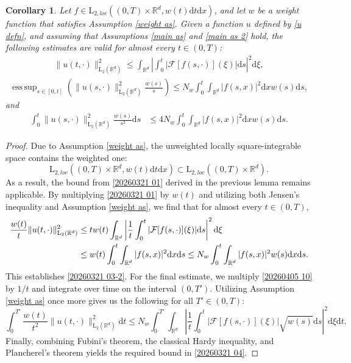 \documentclass[11pt,reqno]{amsart}
\newtheorem{corollary}[thm]{Corollary}
\theoremstyle{definition}
\theoremstyle{remark}
\newcommand\bR{\mathbb{R}}
\DeclareMathOperator*{\esssup}{ess\,sup}
\numberwithin{equation}{section}
\begin{document}
\begin{corollary}
							\label{l2 bounded corollary 1}
Let $f \in \mathrm{L}_{2,loc}\left( (0,T) \times \mathbb{R}^d, w(t)\mathrm{d}t\mathrm{d}x \right)$, and let $w$ be a weight function that satisfies Assumption \ref{weight as}. 
Given a function $u$ defined by \eqref{u defn}, and assuming that Assumptions \ref{main as} and \ref{main as 2} hold, the following estimates are valid for almost every $t \in (0,T)$:
\begin{align*}
\|u(t,\cdot)\|^2_{\mathrm{L}_2(\mathbb{R}^d)}  
\leq \int_{\mathbb{R}^d} \left|\int_0^t |\mathcal{F}[f(s,\cdot)](\xi)| \mathrm{d}s \right|^2 \mathrm{d}\xi,
\end{align*}
\begin{align}
										\label{20260321 03-2}
\esssup_{s \in [0,t]} \left( \|u(s,\cdot)\|^2_{\mathrm{L}_2(\bR^d)} \frac{w(s)}{s} \right)
\leq  N_w\int_0^{t} \int_{\bR^d} |f(s,x)|^2  \mathrm{d}x  w(s)  \mathrm{d}s,
\end{align}
and
\begin{align}
									\label{20260321 04}
\int_0^{t} \|u(s,\cdot)\|^2_{\mathrm{L}_2(\bR^d)}\frac{w(s)}{s^2}  \mathrm{d}s
&\leq 4 N_w\int_0^{t} \int_{\bR^d} \left|f(s,x) \right|^2 \mathrm{d}x w(s)\mathrm{d}s.
\end{align}
\end{corollary}
\begin{proof}
Due to Assumption \ref{weight as}, the unweighted locally square-integrable space contains the weighted one:
$$
\mathrm{L}_{2,loc}\left( (0,T) \times \mathbb{R}^d, w(t)\mathrm{d}t\mathrm{d}x \right) \subset \mathrm{L}_{2,loc}\left( (0,T) \times \mathbb{R}^d \right).
$$
As a result, the bound from \eqref{20260321 01} derived in the previous lemma remains applicable. 
By multiplying \eqref{20260321 01} by $w(t)$ and utilizing both Jensen's inequality and Assumption \ref{weight as}, we find that for almost every $t \in (0,T)$,
\begin{align}
										\label{20260405 10}
\frac{w(t)}{t} \|u(t,\cdot)\|^2_{\mathrm{L}_2(\mathbb{R}^d)} 
&\leq t w(t)\int_{\mathbb{R}^d} \left| \frac{1}{t}\int_0^t |\mathcal{F}[f(s,\cdot)](\xi)| \mathrm{d}s \right|^2 \mathrm{d}\xi\\
										\notag
&\leq w(t)\int_0^t \int_{\mathbb{R}^d} |f(s,x)|^2 \mathrm{d}x \mathrm{d}s  
\leq N_w \int_0^t \int_{\mathbb{R}^d} |f(s,x)|^2 w(s) \mathrm{d}x \mathrm{d}s.
\end{align}
This establishes \eqref{20260321 03-2}. 
For the final estimate, we multiply \eqref{20260405 10} by $1/t$ and integrate over time on the interval $(0, T')$. 
Utilizing Assumption \ref{weight as} once more gives us the following for all $T' \in (0,T)$:
$$
\int_0^{T'} \frac{w(t)}{t^2} \|u(t,\cdot)\|^2_{\mathrm{L}_2(\mathbb{R}^d)} \mathrm{d}t 
\leq N_w \int_0^{T'} \int_{\mathbb{R}^d} \left| \frac{1}{t}\int_0^t |\mathcal{F}[f(s,\cdot)](\xi)| \sqrt{w(s)}\mathrm{d}s \right|^2 \mathrm{d}\xi \mathrm{d}t.
$$
Finally, combining Fubini's theorem, the classical Hardy inequality, and Plancherel's theorem yields the required bound in \eqref{20260321 04}.
\end{proof}
\end{document}
